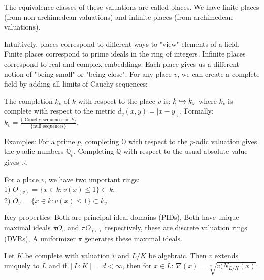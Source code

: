 
\begin{outline}
\0 \begin{definition}
    The equivalence classes of these valuations are called places. We have finite places (from non-archimedean valuations) and infinite places (from archimedean valuations).
\end{definition}

\1 Intuitively, places correspond to different ways to "view" elements of a field. Finite places correspond to prime ideals in the ring of integers. Infinite places correspond to real and complex embeddings. Each place gives us a different notion of "being small" or "being close". For any place $v$, we can create a complete field by adding all limits of Cauchy sequences:

\0 \begin{definition}
    The completion $k_v$ of $k$ with respect to the place $v$ is:
$k \xhookrightarrow{} k_v$ where $k_v$ is complete with respect to the metric $d_v(x,y)=|x-y|_v$. Formally: $k_v = \frac{\{\text{ Cauchy sequences in }k\}}{\{\text{null sequences}\}}$.
\end{definition}

\1 Examples: For a prime $p$, completing $\mathbb{Q}$ with respect to the $p$-adic valuation gives the $p$-adic numbers $\mathbb{Q}_p$. Completing $\mathbb{Q}$ with respect to the usual absolute value gives $\mathbb{R}$.

\0 \begin{definition}
    For a place $v$, we have two important rings:\\
    1) $O_{(v)}$ = $\{x\in k : v(x)\leq 1\}\subset k$. \\ 
    2) $O_v$ = $\{x\in k : v(x)\leq 1\}\subset k_v$.
\end{definition}

\1 Key properties:
    \2 Both are principal ideal domains (PIDs),
    \2 Both have unique maximal ideals $\pi O_v$ and $\pi O_{(v)}$ respectively, these are discrete valuation rings (DVRs),
    \2 A uniformizer $\pi$ generates these maximal ideals.

\0 \begin{theorem}
    Let $K$ be complete with valuation $v$ and $L/K$ be algebraic. Then $v$ extends uniquely to $L$ and if $[L:K]=d < \infty$, then for $x\in L$: $\nabla(x)=\sqrt[d]{v(N_{L/K}(x)}$.
\end{theorem}


\end{outline}
